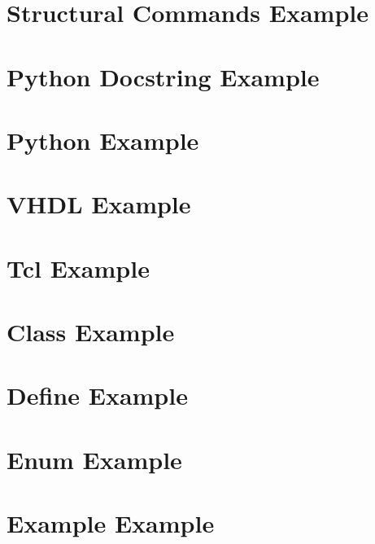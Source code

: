 \documentclass{book}
\newcommand{\+}{\discretionary{\mbox{\scriptsize$\hookleftarrow$}}{}{}}
\begin{document}
\chapter{Structural Commands Example}\label{structcmd_example}\hypertarget{structcmd_example}{}
\chapter{Python Docstring Example}\label{python_example}\hypertarget{python_example}{}
\chapter{Python Example}\label{py_example}\hypertarget{py_example}{}
\chapter{VHDL Example}\label{vhdl_example}\hypertarget{vhdl_example}{}
\chapter{Tcl Example}\label{tcl_example}\hypertarget{tcl_example}{}

\chapter{Class Example}\label{class_example}\hypertarget{class_example}{}
\chapter{Define Example}\label{define_example}\hypertarget{define_example}{}
\chapter{Enum Example}\label{enum_example}\hypertarget{enum_example}{}
\chapter{Example Example}\label{example_example}\hypertarget{example_example}{}
\end{document}
